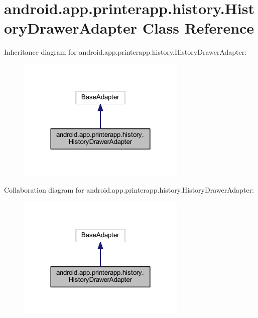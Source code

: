 \hypertarget{classandroid_1_1app_1_1printerapp_1_1history_1_1_history_drawer_adapter}{}\section{android.\+app.\+printerapp.\+history.\+History\+Drawer\+Adapter Class Reference}
\label{classandroid_1_1app_1_1printerapp_1_1history_1_1_history_drawer_adapter}


Inheritance diagram for android.\+app.\+printerapp.\+history.\+History\+Drawer\+Adapter\+:
\nopagebreak
\begin{figure}[H]
\begin{center}
\leavevmode
\includegraphics[width=228pt]{classandroid_1_1app_1_1printerapp_1_1history_1_1_history_drawer_adapter__inherit__graph}
\end{center}
\end{figure}


Collaboration diagram for android.\+app.\+printerapp.\+history.\+History\+Drawer\+Adapter\+:
\nopagebreak
\begin{figure}[H]
\begin{center}
\leavevmode
\includegraphics[width=228pt]{classandroid_1_1app_1_1printerapp_1_1history_1_1_history_drawer_adapter__coll__graph}
\end{center}
\end{figure}
